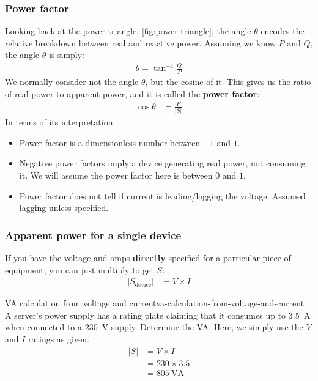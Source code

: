 \documentclass{pgnotes}
\begin{document}
\subsubsection{Power factor}
\label{sec:power-factor}

Looking back at the power triangle, \autoref{fig:power-triangle}, the angle $\theta$ encodes the relative breakdown between real and reactive power.
Assuming we know $P$ and $Q$, the angle $\theta$ is simply:
\begin{align}
  \theta = \tan^{-1} \frac{Q}{P} 
\end{align}
We normally consider not the angle $\theta$, but the cosine of it.
This gives us the ratio of real power to apparent power, and it is called the \textbf{power factor}: 
\begin{align}
  \cos \theta & = \frac{P}{\left \lvert S \right \rvert}
\end{align}
In terms of its interpretation:
\begin{itemize}
\item Power factor is a dimensionless number between $-1$ and $1$.
\item Negative power factors imply a device generating real power, not consuming it. We will assume the power factor here is between $0$ and $1$.
\item Power factor does not tell if current is leading/lagging the voltage. Assumed lagging unless specified.
\end{itemize}

\subsubsection{Apparent power for a single device}

If you have the voltage and amps \textbf{directly} specified for a particular piece of equipment, you can just multiply to get $S$:
\begin{align}
  \left \vert S_{\mbox{device}} \right \rvert & = V \times I 
\end{align}


\begin{example}{VA calculation from voltage and current}{va-calculation-from-voltage-and-current}
  A server's power supply has a rating plate claiming that it consumes up to \SI{3.5}{\ampere} when connected to a \SI{230}{\volt} supply.
  Determine the VA.
  \tcblower
  Here, we simply use the $V$ and $I$ ratings as given.
  \begin{align}
    \left \lvert S \right \rvert & = V \times I \\
                                 & = 230 \times 3.5 \\
                                 & = \SI{805}{\volt\ampere}
  \end{align}
\end{example}
\end{document}
